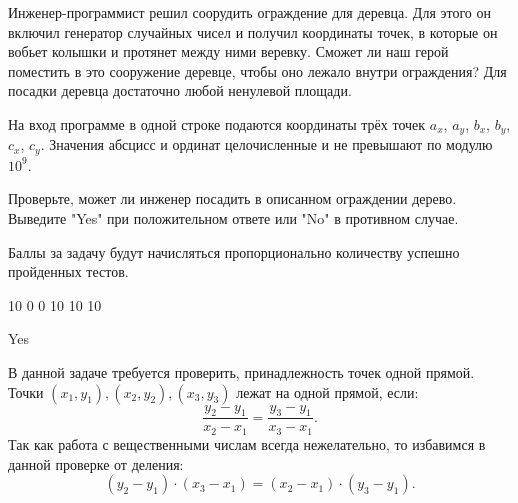 
Инженер-программист решил соорудить ограждение для деревца. Для этого он включил генератор случайных чисел и получил координаты точек, в которые он вобьет колышки и протянет между ними веревку. Сможет ли наш герой поместить в это сооружение деревце, чтобы оно лежало внутри ограждения? Для посадки деревца достаточно любой ненулевой площади.


На вход программе в одной строке подаются координаты трёх точек $a_x$, $a_y$, $b_x$, $b_y$, $c_x$, $c_y$. 
Значения абсцисс и ординат целочисленные и не превышают по модулю $10^9$. 

\outputfmtSection

Проверьте, может ли инженер посадить в описанном ограждении дерево. Выведите "Yes" при положительном ответе или "No" в противном случае.

\markSection

Баллы за задачу будут начисляться пропорционально количеству успешно пройденных тестов.


\begin{myverbbox}[\small]{\vinput}
    10 0 0 10 10 10
\end{myverbbox}

\begin{myverbbox}[\small]{\voutput}
    Yes
\end{myverbbox}

\solutionSection

В данной задаче требуется проверить, принадлежность точек одной прямой. Точки $(x_1, y_1), (x_2, y_2), (x_3, y_3)$ лежат на одной прямой, если:
$$\frac{y_2-y_1}{x_2-x_1} = \frac{y_3-y_1}{x_3-x_1}.$$
Так как работа с вещественными числам всегда нежелательно, то избавимся в данной проверке от деления:
$$(y_2-y_1)\cdot(x_3-x_1) = (x_2-x_1)\cdot(y_3-y_1).$$

